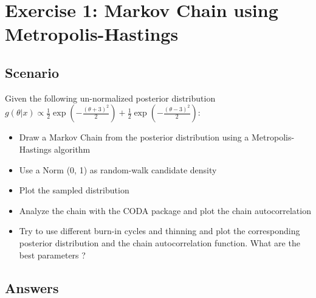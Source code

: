\documentclass[
]{article}
\newenvironment{Shaded}{\begin{snugshade}}{\end{snugshade}}
\newcommand{\AttributeTok}[1]{\textcolor[rgb]{0.13,0.29,0.53}{#1}}
\newcommand{\ControlFlowTok}[1]{\textcolor[rgb]{0.13,0.29,0.53}{\textbf{#1}}}
\newcommand{\FunctionTok}[1]{\textcolor[rgb]{0.13,0.29,0.53}{\textbf{#1}}}
\newcommand{\NormalTok}[1]{#1}
\newcommand{\OtherTok}[1]{\textcolor[rgb]{0.56,0.35,0.01}{#1}}
\newcommand{\SpecialCharTok}[1]{\textcolor[rgb]{0.81,0.36,0.00}{\textbf{#1}}}
\begin{document}
\begin{Shaded}
\end{Shaded}

\hypertarget{exercise-1-markov-chain-using-metropolis-hastings}{%
\section{Exercise 1: Markov Chain using
Metropolis-Hastings}\label{exercise-1-markov-chain-using-metropolis-hastings}}

\hypertarget{scenario}{%
\subsection{Scenario}\label{scenario}}

Given the following un-normalized posterior distribution
\(g(\theta | x) \propto \frac{1}{2} \exp \left( -\frac{(\theta + 3)^2}{2} \right) + \frac{1}{2} \exp \left( -\frac{(\theta - 3)^2}{2} \right)\):

\begin{itemize}
\item
  Draw a Markov Chain from the posterior distribution using a
  Metropolis-Hastings algorithm
\item
  Use a Norm (0, 1) as random-walk candidate density
\item
  Plot the sampled distribution
\item
  Analyze the chain with the CODA package and plot the chain
  autocorrelation
\item
  Try to use different burn-in cycles and thinning and plot the
  corresponding posterior distribution and the chain autocorrelation
  function. What are the best parameters ?
\end{itemize}

\hypertarget{answers}{%
\subsection{Answers}\label{answers}}
\end{document}
